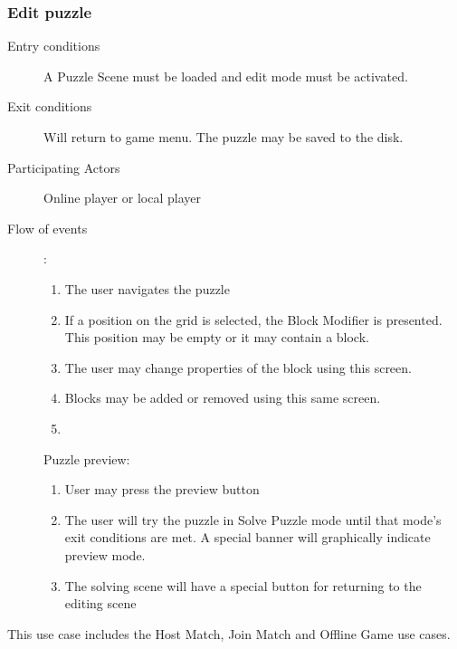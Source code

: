 \documentclass[12pt]{article}
\begin{document}
    \subsubsection{Edit puzzle}
    \begin{description}
        \item[Entry conditions] A Puzzle Scene must be loaded and edit mode
            must be activated.
        \item[Exit conditions] Will return to game menu. The puzzle may be
            saved to the disk.
        \item[Participating Actors] Online player or local player
        \item[Flow of events]:
            \begin{enumerate}
                \item The user navigates the puzzle
                \item If a position on the grid is selected, the Block Modifier
                    is presented. This position may be empty or it may
                    contain a block.
                \item The user may change properties of the block using this
                    screen.
                \item Blocks may be added or removed using this same screen.
                \item
            \end{enumerate}
            Puzzle preview:
            \begin{enumerate}
                \item User may press the preview button
                \item The user will try the puzzle in Solve Puzzle mode until
                    that mode's exit conditions are met.
                    A special banner will graphically indicate preview mode.
                \item The solving scene will have a special button for
                    returning to the editing scene
            \end{enumerate}
    \end{description}


    This use case includes the Host Match, Join Match and Offline Game
    use cases.
\end{document}
